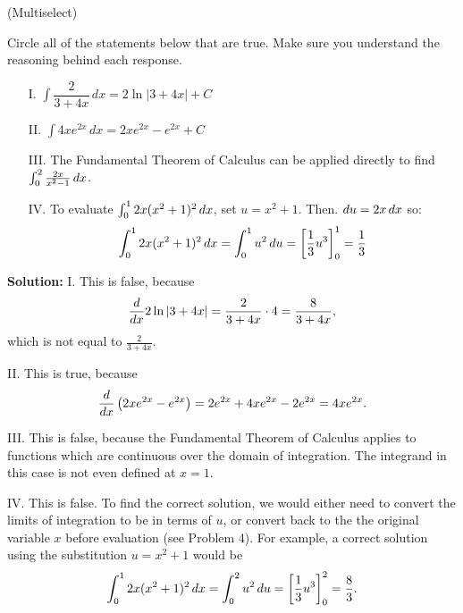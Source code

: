 \documentclass[handout,hints]{ximera}
\begin{document}
\begin{problem}
(Multiselect)

Circle all of the statements below that are true.  Make sure you understand the reasoning behind each response.

\begin{itemize}
\item[I.] $\displaystyle \int \dfrac{2}{3+4x} \, dx = 2\ln|3+4x|+C$

\item[II.] $\displaystyle \int 4xe^{2x} \, dx = 2xe^{2x}-e^{2x}+C$

\item[III.] The Fundamental Theorem of Calculus can be applied directly to find $ \int_0^2 \frac{2x}{x^2-1} \mathop{}\!d x$.

\item[IV.] To evaluate $ \int_0^1 2x(x^2+1)^2 \mathop{}\!d x$, set $u=x^2+1$.  Then. $\mathop{}\!d u = 2x \mathop{}\!d x$ so:
\[ \int_0^1 2x(x^2+1)^2 \mathop{}\!d x = \int_0^1 u^2 \mathop{}\!d u = \bigg[ \frac{1}{3} u^3 \bigg]_0^1 = \frac{1}{3}\]
\end{itemize}

\end{problem}

\textbf{Solution:} I. This is false, because
$$
\frac{\mathop{}\!d}{\mathop{}\!d x} 2 \ln |3+4x| = \frac{2}{3+4x} \cdot 4 = \frac{8}{3+4x},
$$
which is not equal to $\frac{2}{3+4x}$. 

II. This is true, because
$$
\frac{\mathop{}\!d}{\mathop{}\!d x} \left( 2xe^{2x}-e^{2x}\right) = 2 e^{2x} + 4x e^{2x} - 2 e^{2x} = 4x e^{2x}.
$$

III. This is false, because the Fundamental Theorem of Calculus applies to functions which are continuous over the domain of integration. The integrand in this case is not even defined at $x=1$. 

IV. This is false. To find the correct solution, we would either need to convert the limits of integration to be in terms of $u$, or convert back to the the original variable $x$ before evaluation (see Problem 4). For example, a correct solution using the substitution $u = x^2 +1 $ would be 
$$
\int_0^1 2x(x^2+1)^2 \mathop{}\!d x = \int_0^2 u^2 \mathop{}\!d u = \bigg[ \frac{1}{3} u^3 \bigg]_0^2 = \frac{8}{3}.
$$
\end{document}
